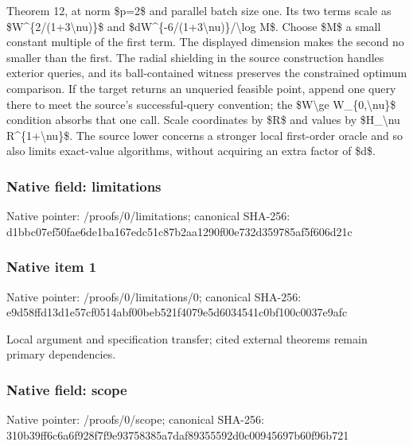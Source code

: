 \documentclass[10pt,a4paper]{article}
\begin{document}
Theorem 12,\allowbreak{} at norm \$p=\allowbreak{}2\$ and parallel batch size one. Its two terms scale as \$W\textasciicircum{}\{2/\allowbreak{}(1+3\textbackslash{}nu)\}\$ and \$dW\textasciicircum{}\{-6/\allowbreak{}(1+3\textbackslash{}nu)\}/\allowbreak{}\textbackslash{}log M\$. Choose \$M\$ a small constant multiple of the first term. The displayed dimension makes the second no smaller than the first. The radial shielding in the source construction handles exterior queries,\allowbreak{} and its ball-contained witness preserves the constrained optimum comparison. If the target returns an unqueried feasible point,\allowbreak{} append one query there to meet the source's successful-query convention;\allowbreak{} the \$W\textbackslash{}ge W\_\allowbreak{}\{0,\allowbreak{}\textbackslash{}nu\}\$ condition absorbs that one call. Scale coordinates by \$R\$ and values by \$H\_\allowbreak{}\textbackslash{}nu R\textasciicircum{}\{1+\textbackslash{}nu\}\$. The source lower concerns a stronger local first-order oracle and so also limits exact-value algorithms,\allowbreak{} without acquiring an extra factor of \$d\$.\par\endgroup

\subsubsection{Native field: limitations}
Native pointer: /proofs/0/limitations; canonical SHA-256: d1bbc07ef50fae6de1ba167edc51c87b2aa1290f00e732d359785af5f606d21c

\subsubsection{Native item 1}
Native pointer: /proofs/0/limitations/0; canonical SHA-256: e9d58ffd13d1e57cf0514abf00beb521f4079e5d6034541c0bf100c0037e9afc

\begingroup\raggedright\sloppy Local argument and specification transfer;\allowbreak{} cited external theorems remain primary dependencies.\par\endgroup

\subsubsection{Native field: scope}
Native pointer: /proofs/0/scope; canonical SHA-256: 310b39ff6c6a6f928f7f9e93758385a7daf89355592d0c00945697b60f96b721
\end{document}
